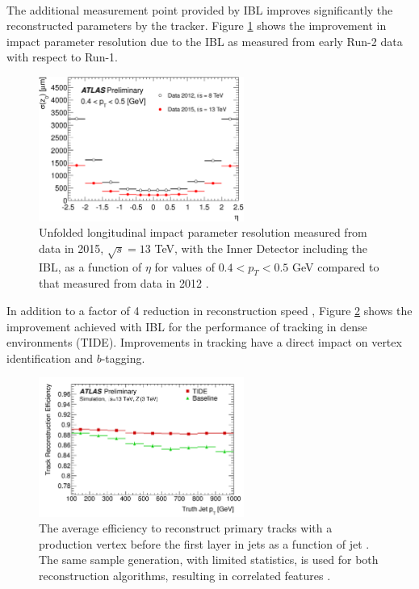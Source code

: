 \\
The additional measurement point provided by IBL improves significantly the reconstructed parameters by the tracker. Figure \ref{fig:chap2:ATLAS:ITK:IBL:Imp} shows the improvement in impact parameter resolution due to the IBL as measured from early Run-2 data with respect to Run-1. 
\begin{figure}[htbp]
    \centering
    \includegraphics[width=0.6\textwidth]{Ch2/Img/IBL_impact.png}
    \caption{Unfolded longitudinal impact parameter resolution measured from data in 2015, $\sqrt{s}= 13$ TeV, with the Inner Detector including the IBL, as a function of $\eta$  for values of $0.4 < p_{T} < 0.5$ GeV compared to that measured from data in 2012 \cite{IBL_IP}.}
    \label{fig:chap2:ATLAS:ITK:IBL:Imp}
\end{figure}
In addition to a factor of 4 reduction in reconstruction speed \cite{IBL_Time}, Figure \ref{fig:chap2:ATLAS:ITK:IBL:Trk} shows the improvement achieved with IBL for the performance of tracking in dense environments (TIDE). Improvements in tracking have a direct impact on vertex identification and $b$-tagging. 
\begin{figure}[htbp]
    \centering
    \includegraphics[width=0.6\textwidth]{Ch2/Img/IBL_track.png}
    \caption{The average efficiency to reconstruct primary tracks with a production vertex before the first layer in jets as a function of jet \pT. The same sample generation, with limited statistics, is used for both reconstruction algorithms, resulting in correlated features \cite{IBL_Trk}.}
    \label{fig:chap2:ATLAS:ITK:IBL:Trk}
\end{figure}
